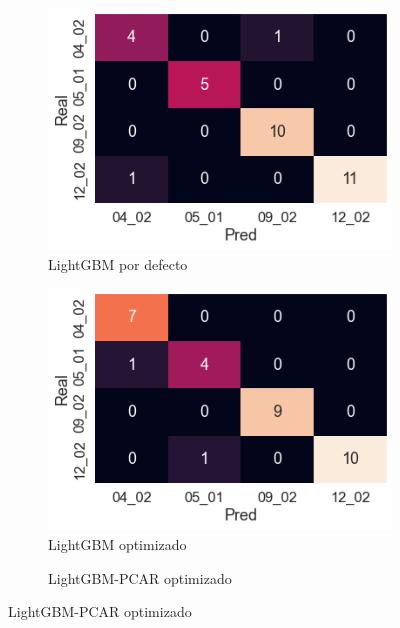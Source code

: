 \documentclass[12pt]{article}
\begin{document}
\begin{figure}[htbp]
\begin{subfigure}[b]{0.35\textwidth}
    \end{subfigure}
    \begin{subfigure}[b]{0.35\textwidth}
        \caption{LightGBM por defecto}
        \includegraphics[width=\textwidth]{LightGBMbase.png}
    \end{subfigure}
    \begin{subfigure}[b]{0.35\textwidth}
        \caption{LightGBM optimizado}
        \includegraphics[width=\textwidth]{LightGBMopt.png}
    \end{subfigure}
    \begin{subfigure}[b]{0.35\textwidth}
        \caption{LightGBM-PCAR optimizado}

\end{subfigure}
\end{figure}
\end{document}
